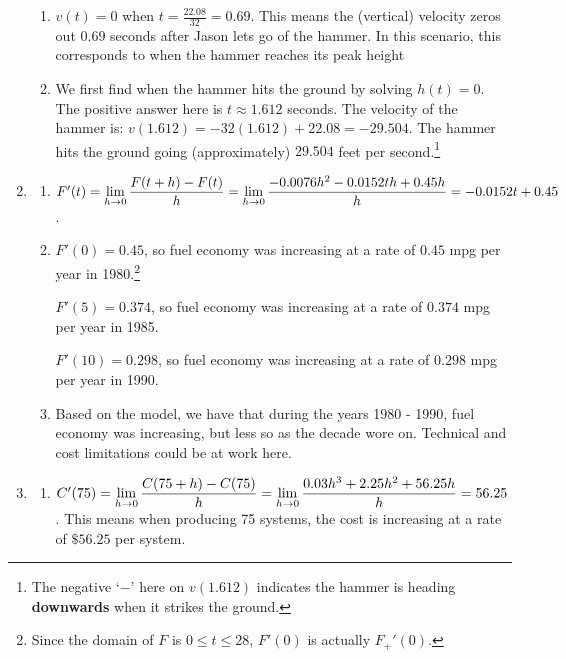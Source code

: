 \begin{enumerate}
\begin{enumerate}
\item  $v(t) = 0$  when $t = \frac{22.08}{32} = 0.69$.  This means the (vertical) velocity zeros out $0.69$ seconds after Jason lets go of the hammer.  In this scenario, this corresponds to when the hammer reaches its peak height

\item  We first find when the hammer hits the ground by solving $h(t) = 0$.  The positive answer here is   $t \approx 1.612$ seconds.  The velocity of the hammer is:  $v(1.612) = -32(1.612) + 22.08 = -29.504$.  The hammer hits the ground going (approximately) $29.504$ feet per second.\footnote{The negative `$-$' here on $v(1.612)$ indicates the hammer is heading \textbf{downwards} when it strikes the ground.}

\end{enumerate}

\item  \begin{enumerate}  \item  $F'(t) = \displaystyle{\lim_{h \rightarrow 0} \dfrac{F(t + h) - F(t)}{h} = \lim_{h \rightarrow 0} \dfrac{-0.0076h^{2} -0.0152th+0.45h}{h} =-0.0152t + 0.45}$.

\item   $F'(0) = 0.45$, so fuel economy was increasing at a rate of $0.45$ mpg per year in 1980.\footnote{Since the domain of $F$ is $0 \leq t \leq 28$, $F'(0)$ is actually $F_{+}'(0)$.}

\smallskip

 $F'(5) = 0.374$,  so fuel economy was increasing at a rate of $0.374$ mpg per year in 1985. 
 
 \smallskip
 
  $F'(10) = 0.298$,  so fuel economy was increasing at a rate of $0.298$ mpg  per year in 1990. 

\item  Based on the model, we have that during the years 1980 - 1990, fuel economy was increasing, but less so as the decade wore on.  Technical and cost limitations could be at work here.

\end{enumerate}

\item   \begin{enumerate}  \item   $C'(75) = \displaystyle{\lim_{h \rightarrow 0} \dfrac{C(75+h) - C(75)}{h}  =     \lim_{h \rightarrow 0} \dfrac{0.03h^{3}+2.25h^{2}+56.25h}{h} = 56.25}$.  This means when producing 75 systems, the cost is increasing at a rate of $\$ 56.25$ per system.


\end{enumerate}
\end{enumerate}
